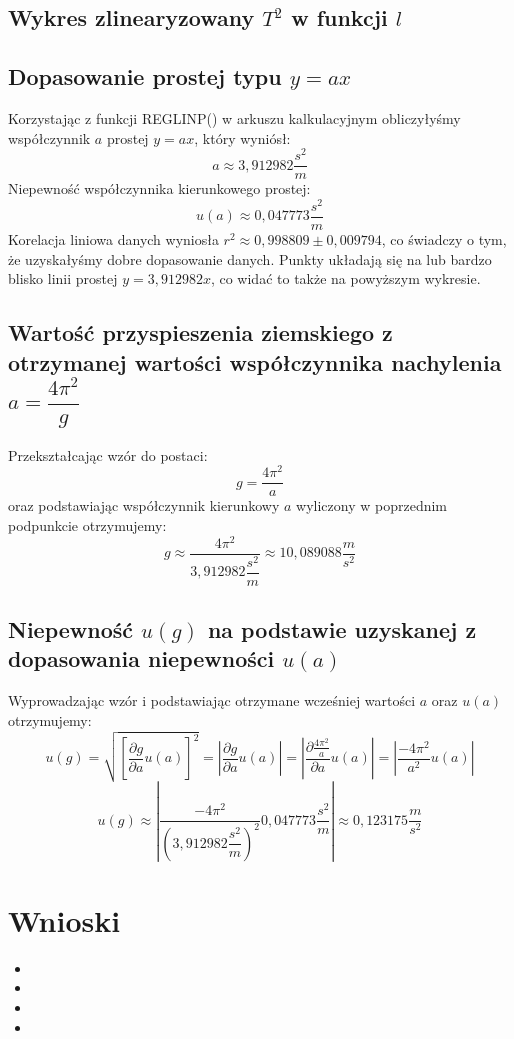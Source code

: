 \documentclass[a4paper,11pt]{article}
\begin{document}
\subsection{Wykres zlinearyzowany $T^{2}$ w funkcji $l$} 

\begin{center}
\end{center}
\subsection{Dopasowanie prostej typu $y = ax$}
Korzystając z funkcji REGLINP() w arkuszu kalkulacyjnym obliczyłyśmy współczynnik $a$ prostej $y = ax$, który wyniósł:
$$a \approx 3,912982 \dfrac{s^{2}}{m}$$
Niepewność współczynnika kierunkowego prostej:
$$u(a)\approx 0,047773 \dfrac{s^{2}}{m}$$
Korelacja liniowa danych wyniosła $r^{2}\approx 0,998809 \pm 0,009794$, co świadczy o tym, że uzyskałyśmy dobre dopasowanie danych. Punkty układają się na lub bardzo blisko linii prostej $y=3,912982x$, co widać to także na powyższym wykresie.
\subsection{Wartość przyspieszenia ziemskiego z otrzymanej wartości współczynnika nachylenia $a =\dfrac{4\pi^{2}}{g}$}
Przekształcając wzór do postaci:
$$g = \dfrac{4\pi^{2}}{a}$$
oraz podstawiając współczynnik kierunkowy $a$ wyliczony w poprzednim podpunkcie otrzymujemy:
$$g \approx \dfrac{4\pi^{2}}{3,912982\dfrac{s^{2}}{m}} \approx 10,089088\dfrac{m}{s^{2}}$$
\subsection{Niepewność $u(g)$ na podstawie uzyskanej z dopasowania niepewności $u(a)$}
Wyprowadzając wzór i podstawiając otrzymane wcześniej wartości $a$ oraz $u(a)$ otrzymujemy: 
$$u(g)=\sqrt{\left[\frac{\partial g}{\partial a}u(a)\right]^{2}}=\left|\frac{\partial g}{\partial a}u(a)\right|=\left|\frac{\partial\frac{4\pi^{2}}{a}}{\partial a}u(a)\right|=\left|\frac{-4\pi^{2}}{a^{2}}u(a)\right|$$
$$u(g)\approx\left|\frac{-4\pi^{2}}{ \left(3,912982 \dfrac{s^{2}}{m}\right)^{2}}0,047773 \dfrac{s^{2}}{m}\right| \approx 0,123175\dfrac{m}{s^{2}}$$

\section{Wnioski}
\begin{itemize}
\item 
\item  
\item
\item
\end{itemize}
\end{document}
